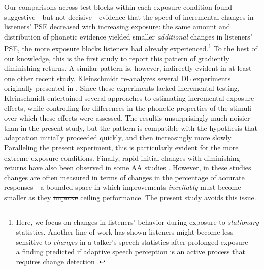 \documentclass[
  11pt,
  man,mask,floatsintext]{apa6}
\makeatletter
\providecommand{\DIFadd}[1]{{\protect\color{blue}\uwave{#1}}} %
\providecommand{\DIFdel}[1]{{\protect\color{red}\sout{#1}}} %
\providecommand{\DIFaddbegin}{} %
\providecommand{\DIFaddend}{} %
\providecommand{\DIFdelbegin}{} %
\providecommand{\DIFdelend}{} %
\newcommand{\DIFscaledelfig}{0.5}
\newlength{\DIFdelgraphicswidth} %
\newlength{\DIFdelgraphicsheight} %
\newcommand{\DIFaddincludegraphics}[2][]{{\color{blue}\fbox{\DIFOincludegraphics[#1]{#2}}}} %
\newcommand{\DIFdelincludegraphics}[2][]{%
\sbox{\DIFdelgraphicsbox}{\DIFOincludegraphics[#1]{#2}}%
\settoboxwidth{\DIFdelgraphicswidth}{\DIFdelgraphicsbox} %
\settoboxtotalheight{\DIFdelgraphicsheight}{\DIFdelgraphicsbox} %
\scalebox{\DIFscaledelfig}{%
\parbox[b]{\DIFdelgraphicswidth}{\usebox{\DIFdelgraphicsbox}\\[-\baselineskip] \rule{\DIFdelgraphicswidth}{0em}}\llap{\resizebox{\DIFdelgraphicswidth}{\DIFdelgraphicsheight}{%
\setlength{\unitlength}{\DIFdelgraphicswidth}%
\begin{picture}(1,1)%
\thicklines\linethickness{2pt} %
{\color[rgb]{1,0,0}\put(0,0){\framebox(1,1){}}}%
{\color[rgb]{1,0,0}\put(0,0){\line( 1,1){1}}}%
{\color[rgb]{1,0,0}\put(0,1){\line(1,-1){1}}}%
\end{picture}%
}\hspace*{3pt}}} %
} %
\DeclareRobustCommand{\DIFaddbegin}{\DIFOaddbegin \let\includegraphics\DIFaddincludegraphics} %
\DeclareRobustCommand{\DIFaddend}{\DIFOaddend \let\includegraphics\DIFOincludegraphics} %
\DeclareRobustCommand{\DIFdelbegin}{\DIFOdelbegin \let\includegraphics\DIFdelincludegraphics} %
\DeclareRobustCommand{\DIFdelend}{\DIFOaddend \let\includegraphics\DIFOincludegraphics} %
\let\sout@orig\sout %
\renewcommand{\sout}[1]{\ifmmode\text{\sout@orig{\ensuremath{#1}}}\else\sout@orig{#1}\fi} %
\makeatother
\begin{document}
Our comparisons across test blocks within each exposure condition found suggestive---but not decisive---evidence that the speed of incremental changes in listeners' PSE decreased with increasing exposure: the same amount and distribution of phonetic evidence yielded smaller \emph{additional} changes in listeners' PSE, the more exposure blocks listeners had already experienced.\footnote{Here, we focus on changes in listeners' behavior during exposure to \emph{stationary} statistics. Another line of work has shown listeners might become less sensitive to \emph{changes} in a talker's speech statistics after prolonged exposure \autocites[e.g.,][]{kraljic-samuel2011,saltzman-myers2021}[but see][]{theodore-monto2019}---a finding predicted if adaptive speech perception is an active process \autocite{magnuson-nusbaum2007} that requires change detection \autocite{qian2012}.} To the best of our knowledge, this is the first study to report this pattern of gradiently diminishing returns. A similar pattern is, however, indirectly evident in at least one other recent study. Kleinschmidt \autocite*[Experiment 3]{kleinschmidt2020} re-analyzes several DL experiments originally presented in \textcite{kleinschmidt-jaeger2016}. Since these experiments lacked incremental testing, Kleinschmidt entertained several approaches to estimating incremental exposure effects, while controlling for differences in the phonetic properties of the stimuli over which these effects were assessed. The resultis unsurprisingly much noisier than in the present study, but the pattern is compatible with the hypothesis that adaptation initially proceeded quickly, and then increasingly more slowly. Paralleling the present experiment, this is particularly evident for the more extreme exposure conditions. Finally, rapid initial changes with diminishing returns have also been observed in some AA studies \autocites{bieber2023}[SI \(\S3\)]{xie2021jep}. However, in these studies changes are often measured in terms of changes in the percentage of accurate responses---a bounded space in which improvements \emph{inevitably} must become smaller as they \DIFdelbegin \DIFdel{improve }\DIFdelend \DIFaddbegin \DIFadd{approach }\DIFaddend ceiling performance. The present study avoids this issue.
\end{document}
